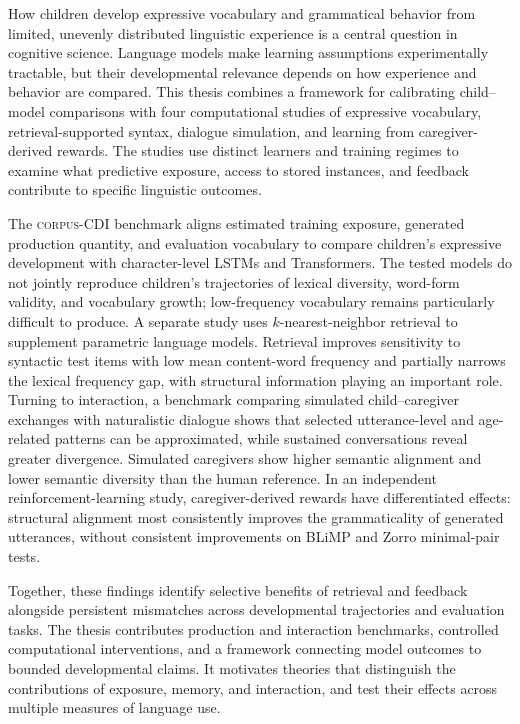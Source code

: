 How children develop expressive vocabulary and grammatical behavior from limited, unevenly distributed linguistic experience is a central question in cognitive science. Language models make learning assumptions experimentally tractable, but their developmental relevance depends on how experience and behavior are compared. This thesis combines a framework for calibrating child--model comparisons with four computational studies of expressive vocabulary, retrieval-supported syntax, dialogue simulation, and learning from caregiver-derived rewards. The studies use distinct learners and training regimes to examine what predictive exposure, access to stored instances, and feedback contribute to specific linguistic outcomes.

The \textsc{corpus-CDI} benchmark aligns estimated training exposure, generated production quantity, and evaluation vocabulary to compare children's expressive development with character-level LSTMs and Transformers. The tested models do not jointly reproduce children's trajectories of lexical diversity, word-form validity, and vocabulary growth; low-frequency vocabulary remains particularly difficult to produce. A separate study uses $k$-nearest-neighbor retrieval to supplement parametric language models. Retrieval improves sensitivity to syntactic test items with low mean content-word frequency and partially narrows the lexical frequency gap, with structural information playing an important role. Turning to interaction, a benchmark comparing simulated child--caregiver exchanges with naturalistic dialogue shows that selected utterance-level and age-related patterns can be approximated, while sustained conversations reveal greater divergence. Simulated caregivers show higher semantic alignment and lower semantic diversity than the human reference. In an independent reinforcement-learning study, caregiver-derived rewards have differentiated effects: structural alignment most consistently improves the grammaticality of generated utterances, without consistent improvements on BLiMP and Zorro minimal-pair tests.

Together, these findings identify selective benefits of retrieval and feedback alongside persistent mismatches across developmental trajectories and evaluation tasks. The thesis contributes production and interaction benchmarks, controlled computational interventions, and a framework connecting model outcomes to bounded developmental claims. It motivates theories that distinguish the contributions of exposure, memory, and interaction, and test their effects across multiple measures of language use.

